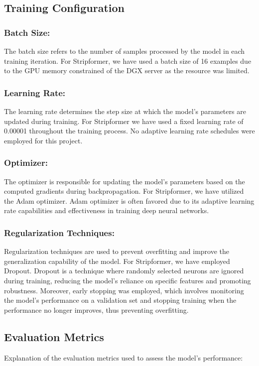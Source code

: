 \documentclass[12pt, a4paper, twoside]{article}
\begin{document}
		\subsection{Training Configuration}
			\subsubsection{Batch Size:}
				The batch size refers to the number of samples processed by the model in each training iteration. For Stripformer, we have used a batch size of 16 examples due to the GPU memory constrained of the DGX server as the resource was limited.
				
			\subsubsection{Learning Rate:}
				The learning rate determines the step size at which the model's parameters are updated during training. For Stripformer we have used a fixed learning rate of 0.00001 throughout the training process. No adaptive learning rate schedules were employed for this project.
				
			\subsubsection{Optimizer:}
				The optimizer is responsible for updating the model's parameters based on the computed gradients during backpropagation. For Stripformer, we have utilized the Adam optimizer. Adam optimizer is often favored due to its adaptive learning rate capabilities and effectiveness in training deep neural networks.
				
			\subsubsection{Regularization Techniques:}		
				Regularization techniques are used to prevent overfitting and improve the generalization capability of the model. For Stripformer, we have employed Dropout. Dropout is a technique where randomly selected neurons are ignored during training, reducing the model's reliance on specific features and promoting robustness.  Moreover, early stopping was employed, which involves monitoring the model's performance on a validation set and stopping training when the performance no longer improves, thus preventing overfitting.

		\subsection{Evaluation Metrics}
		Explanation of the evaluation metrics used to assess the model's performance:
		
\end{document}
